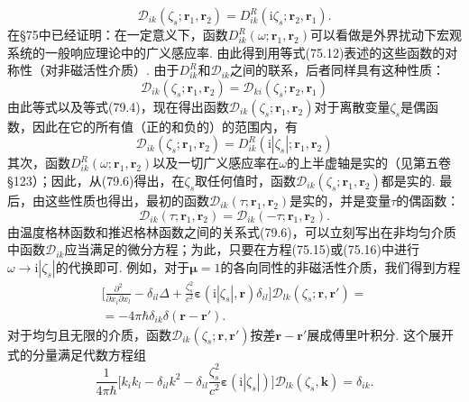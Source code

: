 \begin{equation*}
\mathcal{D}_{ik}(\zeta_{s};\bm{r}_{1},\bm{r}_{2})=D_{ik}^{R}(\mathrm{i}\zeta_{s};\bm{r}_{2},\bm{r}_{1}).
\end{equation*}
在§75中已经证明：在一定意义下，函数$D_{ik}^{R}(\omega;\bm{r}_{1},\bm{r}_{2})$可以看做是外界扰动下宏观系统的一般响应理论中的广义感应率. 由此得到用等式(75.12)表述的这些函数的对称性（对非磁活性介质）. 由于$D_{ik}^{R}$和$\mathcal{D}_{ik}$之间的联系，后者同样具有这种性质：
\begin{equation}
\mathcal{D}_{ik}(\zeta_{s};\bm{r}_{1},\bm{r}_{2})=\mathcal{D}_{ki}(\zeta_{s};\bm{r}_{2},\bm{r}_{1})
\end{equation}
由此等式以及等式(79.4)，现在得出函数$\mathcal{D}_{ik}(\zeta_{s};\bm{r}_{1},\bm{r}_{2})$对于离散变量$\zeta_{s}$是偶函数，因此在它的所有值（正的和负的）的范围内，有
\begin{equation}
\mathcal{D}_{ik}(\zeta_{s};\bm{r}_{1},\bm{r}_{2})=D_{ik}^{R}(\mathrm{i}|\zeta_{s}|;\bm{r}_{1},\bm{r}_{2})
\end{equation}
其次，函数$D_{ik}^{R}(\omega;\bm{r}_{1},\bm{r}_{2})$以及一切广义感应率在$\omega$的上半虚轴是实的（见第五卷§123）；因此，从(79.6)得出，在$\zeta_{s}$取任何值时，函数$\mathcal{D}_{ik}(\zeta_{s};\bm{r}_{1},\bm{r}_{2})$都是实的. 最后，由这些性质也得出，最初的函数$\mathcal{D}_{ik}(\tau;\bm{r}_{1},\bm{r}_{2})$是实的，并是变量$\tau$的偶函数：
\begin{equation}
\mathcal{D}_{ik}(\tau;\bm{r}_{1},\bm{r}_{2})=\mathcal{D}_{ik}(-\tau;\bm{r}_{1},\bm{r}_{2}).
\end{equation}
由温度格林函数和推迟格林函数之间的关系式(79.6)，可以立刻写出在非均匀介质中函数$\mathcal{D}_{ik}$应当满足的微分方程；为此，只要在方程(75.15)或(75.16)中进行$\omega\to\mathrm{i}|\zeta_{s}|$的代换即可. 例如，对于$\bm{\mu}=1$的各向同性的非磁活性介质，我们得到方程
\begin{equation}
\begin{aligned}
\biggl[\frac{\partial^{2}}{\partial x_{i}\partial x_{l}}-\delta_{il}\Delta+\frac{\zeta_{s}^{2}}{c^{2}}\bm{\varepsilon}(\mathrm{i}|\zeta_{s}|,\bm{r})\delta_{il}\biggr]\mathcal{D}_{lk}(\zeta_{s};\bm{r},\bm{r}')={}\\
{}=-4\pi\hbar\delta_{ik}\delta(\bm{r}-\bm{r}').
\end{aligned}
\end{equation}
对于均匀且无限的介质，函数$\mathcal{D}_{ik}(\zeta_{s};\bm{r},\bm{r}')$按差$\bm{r}-\bm{r}'$展成傅里叶积分. 这个展开式的分量满足代数方程组
\begin{equation}
\frac{1}{4\pi\hbar}\biggl[k_{i}k_{l}-\delta_{il}k^{2}-\delta_{il}\frac{\zeta_{s}^{2}}{c^{2}}\bm{\varepsilon}(\mathrm{i}|\zeta_{s}|)\biggr]\mathcal{D}_{lk}(\zeta_{s},\bm{k})=\delta_{ik}.
\end{equation}
